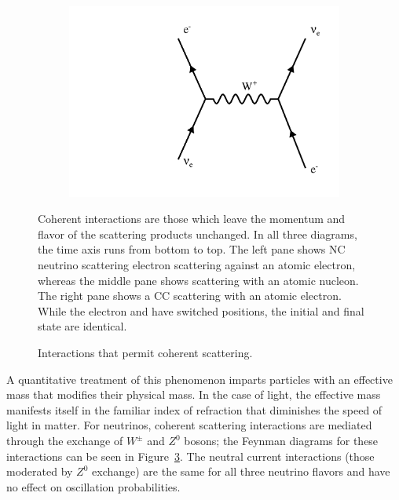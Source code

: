 \begin{figure}[t]
\begin{center}
\begin{subfigure}[b]{0.3\textwidth}
                \caption{}
                 \label{ncHad}
        \end{subfigure}
        ~
        \begin{subfigure}[b]{0.3\textwidth}
                \centering
                \includegraphics[width=\textwidth]{figures/feynman/ccElec.pdf}
                \caption{}
                 \label{ccElec}
        \end{subfigure}
\end{center}
\caption{Interactions that permit coherent scattering.}{
Coherent interactions are those which leave the momentum
and flavor of the scattering products unchanged.
In all three diagrams, the time axis runs from bottom to top.
The left pane shows NC neutrino scattering electron scattering against an
atomic electron, whereas the middle pane shows scattering with an atomic
nucleon.
The right pane shows a CC scattering with an atomic electron.
While the electron and \nue have switched positions, the initial and
final state are identical.
}
\label{cohScatter}
\end{figure}
A quantitative treatment of this phenomenon imparts particles with an effective
mass that modifies their physical mass.
In the case of light, the effective mass manifests itself in the familiar index
of refraction that diminishes the speed of light in matter.
For neutrinos, coherent scattering interactions are mediated through the
exchange of $W^\pm$ and $Z^0$ bosons; the Feynman diagrams for these
interactions can be seen in Figure~\ref{cohScatter}.
The neutral current interactions (those moderated by $Z^0$ exchange) are the
same for all three neutrino flavors and have no effect on oscillation
probabilities.
